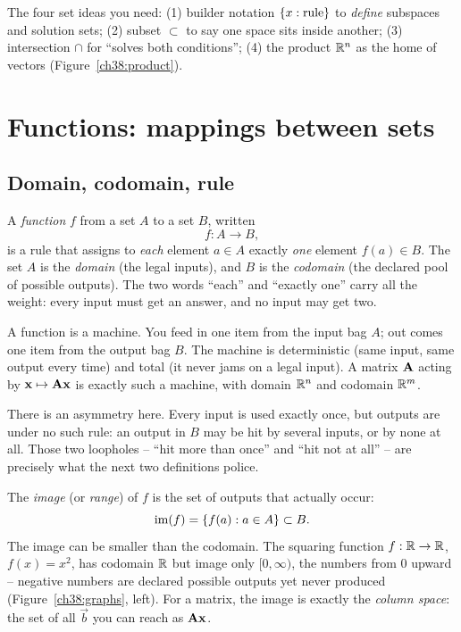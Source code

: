 \begin{focusbox}
The four set ideas you need: (1) builder notation
$\{x : \text{rule}\}$ to \emph{define} subspaces and solution sets; (2) subset $\subset$
to say one space sits inside another; (3) intersection $\cap$ for ``solves both
conditions''; (4) the product $\mathbb{R}^n$ as the home of vectors
(Figure~\ref{ch38:product}).
\end{focusbox}

\section{Functions: mappings between sets}

\subsection{Domain, codomain, rule}

A \emph{function} $f$ from a set $A$ to a set $B$, written
\[
  f : A \to B,
\]
is a rule that assigns to \emph{each} element $a \in A$ exactly \emph{one} element $f(a)
\in B$. The set $A$ is the \emph{domain} (the legal inputs), and $B$ is the \emph{codomain}
(the declared pool of possible outputs). The two words ``each'' and ``exactly one'' carry
all the weight: every input must get an answer, and no input may get two.

\begin{intuitionbox}
A function is a machine. You feed in one item from the input bag $A$; out comes one item
from the output bag $B$. The machine is deterministic (same input, same output every
time) and total (it never jams on a legal input). A matrix
$\mathbf{A}$ acting by $\mathbf{x} \mapsto \mathbf{A}\mathbf{x}$ is exactly such a machine, with
domain $\mathbb{R}^n$ and codomain $\mathbb{R}^m$.
\end{intuitionbox}

There is an asymmetry here. Every input is used exactly once, but outputs are under no such
rule: an output in $B$ may be hit by several inputs, or by none at all. Those two
loopholes -- ``hit more than once'' and ``hit not at all'' -- are precisely what the next
two definitions police.

The \emph{image} (or \emph{range}) of $f$ is the set of outputs that actually occur:
\[
  \operatorname{im}(f) = \{f(a) : a \in A\} \subset B.
\]
The image can be smaller than the codomain. The squaring function $f:\mathbb{R}\to\mathbb{R}$, $f(x)=x^2$,
has codomain $\mathbb{R}$ but image only $[0,\infty)$, the numbers from $0$ upward -- negative
numbers are declared possible outputs yet never produced (Figure~\ref{ch38:graphs}, left).
For a matrix, the image is exactly the \emph{column space}: the set of all $\vec{b}$ you
can reach as $\mathbf{A}\mathbf{x}$.

